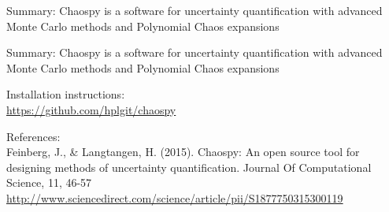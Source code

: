\documentclass[presentation]{beamer}
\begin{document}
\begin{frame}{Summary: Chaospy is a software for uncertainty quantification with advanced Monte Carlo methods and Polynomial Chaos expansions}
\end{frame}


  \begin{frame}{Summary: Chaospy is a software for uncertainty quantification with advanced Monte Carlo methods and Polynomial Chaos expansions}
  \begin{alert}{Installation instructions:}\\
  \scriptsize
      \href{https://github.com/hplgit/chaospy}{https://github.com/hplgit/chaospy}\\
  \end{alert}


\vspace{7mm}

  \begin{alert}{References:}\\
  \scriptsize
      Feinberg, J., \& Langtangen, H. (2015). Chaospy: An open source tool for designing methods of uncertainty quantification. Journal Of Computational Science, 11, 46-57\\
      \href{http://www.sciencedirect.com/science/article/pii/S1877750315300119}{http://www.sciencedirect.com/science/article/pii/S1877750315300119}
  \end{alert}







\end{frame}
\end{document}
